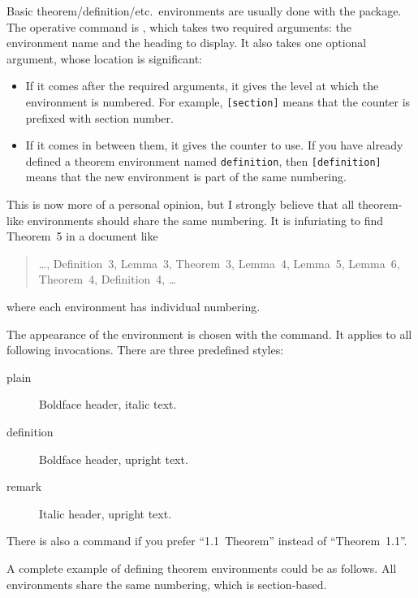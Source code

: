 Basic theorem/definition/etc.\ environments are usually done with the  package.
The operative command is , which takes two required arguments:
the environment name and the heading to display.
It also takes one optional argument, whose location is significant:
\begin{itemize}
\item If it comes after the required arguments,
    it gives the level at which the environment is numbered.
    For example, \verb|[section]| means that the counter is prefixed with section number.
\item If it comes in between them, it gives the counter to use.
    If you have already defined a theorem environment named \verb|definition|,
    then \verb|[definition]| means that the new environment is part of the same numbering.
\end{itemize}

\begin{practices}
This is now more of a personal opinion,
but I strongly believe that all theorem-like environments should share the same numbering.
It is infuriating to find Theorem~5 in a document like
\begin{quote}
    \dots, Definition~3, Lemma~3, Theorem~3, Lemma~4, Lemma~5, Lemma~6, Theorem~4,
    Definition~4, \dots
\end{quote}
where each environment has individual numbering.
\end{practices}

The appearance of the environment is chosen with the  command.
It applies to all following  invocations.
There are three predefined styles:
\begin{description}
\item[plain] Boldface header, italic text.
\item[definition] Boldface header, upright text.
\item[remark] Italic header, upright text.
\end{description}
%
There is also a  command if you prefer ``1.1~Theorem'' instead of ``Theorem~1.1''.

A complete example of defining theorem environments could be as follows.
All environments share the same numbering, which is section-based.
%
\begin{ExampleCode}
\theoremstyle{plain}
\newtheorem{theorem}{Theorem}[section]
\newtheorem{lemma}[theorem]{Lemma}
\newtheorem{corollary}[theorem]{Corollary}

\theoremstyle{remark}
\newtheorem{remark}[theorem]{Remark}
\newtheorem{example}[theorem]{Example}

\theoremstyle{definition}
\newtheorem{definition}[theorem]{Definition}
\end{ExampleCode}

